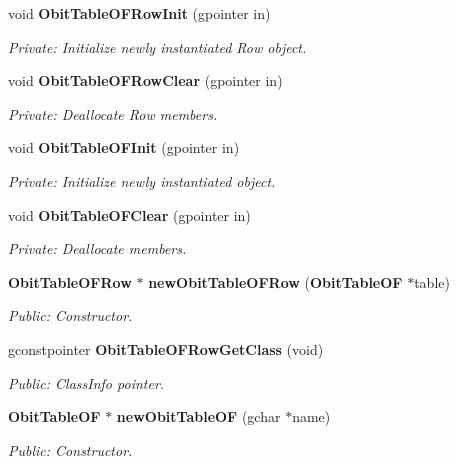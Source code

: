 \begin{CompactItemize}
\item 
void {\bf Obit\-Table\-OFRow\-Init} (gpointer in)
\begin{CompactList}\small\item\em Private: Initialize newly instantiated Row object. \item\end{CompactList}\item 
void {\bf Obit\-Table\-OFRow\-Clear} (gpointer in)
\begin{CompactList}\small\item\em Private: Deallocate Row members. \item\end{CompactList}\item 
void {\bf Obit\-Table\-OFInit} (gpointer in)
\begin{CompactList}\small\item\em Private: Initialize newly instantiated object. \item\end{CompactList}\item 
void {\bf Obit\-Table\-OFClear} (gpointer in)
\begin{CompactList}\small\item\em Private: Deallocate members. \item\end{CompactList}\item 
{\bf Obit\-Table\-OFRow} $\ast$ {\bf new\-Obit\-Table\-OFRow} ({\bf Obit\-Table\-OF} $\ast$table)
\begin{CompactList}\small\item\em Public: Constructor. \item\end{CompactList}\item 
gconstpointer {\bf Obit\-Table\-OFRow\-Get\-Class} (void)
\begin{CompactList}\small\item\em Public: Class\-Info pointer. \item\end{CompactList}\item 
{\bf Obit\-Table\-OF} $\ast$ {\bf new\-Obit\-Table\-OF} (gchar $\ast$name)
\begin{CompactList}\small\item\em Public: Constructor. \item\end{CompactList}\item 

\end{CompactItemize}
